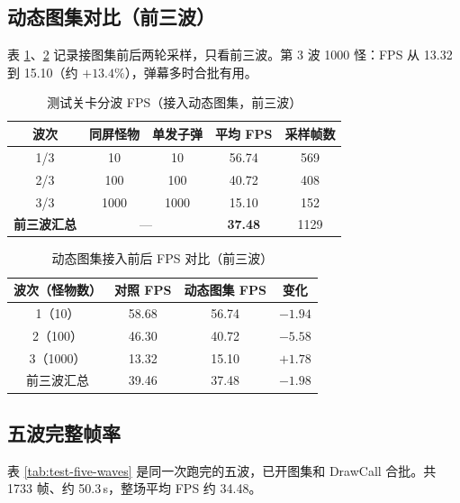 \documentclass[UTF8,a4paper]{ctexart}
\begin{document}
\subsection{动态图集对比（前三波）}

表 \ref{tab:test-level-fps-atlas}、\ref{tab:test-level-fps-compare} 记录接图集前后两轮采样，只看前三波。第 3 波 1000 怪：FPS 从 13.32 到 15.10（约 $+13.4\%$），弹幕多时合批有用。

\begin{table}[htbp]
  
  \caption{测试关卡分波 FPS（接入动态图集，前三波）}
  \label{tab:test-level-fps-atlas}
  \begin{tabular}{ccccc}
    \toprule
    \textbf{波次} & \textbf{同屏怪物} & \textbf{单发子弹} & \textbf{平均 FPS} & \textbf{采样帧数} \\
    \midrule
    1/3 & 10 & 10 & 56.74 & 569 \\
    2/3 & 100 & 100 & 40.72 & 408 \\
    3/3 & 1000 & 1000 & 15.10 & 152 \\
    \midrule
    \textbf{前三波汇总} & \multicolumn{2}{c}{—} & \textbf{37.48} & 1129 \\
    \bottomrule
  \end{tabular}
\end{table}

\begin{table}[htbp]
  
  \caption{动态图集接入前后 FPS 对比（前三波）}
  \label{tab:test-level-fps-compare}
  \begin{tabular}{cccc}
    \toprule
    \textbf{波次（怪物数）} & \textbf{对照 FPS} & \textbf{动态图集 FPS} & \textbf{变化} \\
    \midrule
    1（10） & 58.68 & 56.74 & $-1.94$ \\
    2（100） & 46.30 & 40.72 & $-5.58$ \\
    3（1000） & 13.32 & 15.10 & $+1.78$ \\
    \midrule
    前三波汇总 & 39.46 & 37.48 & $-1.98$ \\
    \bottomrule
  \end{tabular}
\end{table}

\subsection{五波完整帧率}

表 \ref{tab:test-five-waves} 是同一次跑完的五波，已开图集和 DrawCall 合批。共 1733 帧、约 50.3\,s，整场平均 FPS 约 34.48。
\end{document}
